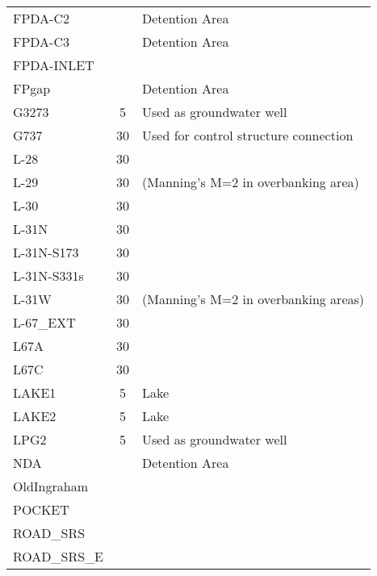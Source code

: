 \begin{table}[!h]
\begin{tabular}{lcl}
FPDA-C2            &              & Detention Area                              \\
FPDA-C3            &              & Detention Area                              \\
FPDA-INLET         &              &                                             \\
FPgap              &              & Detention Area                              \\
G3273              & 5            & Used as groundwater well                    \\
G737               & 30           & Used for control structure connection       \\
L-28               & 30           &                                             \\
L-29               & 30           & (Manning's M=2 in overbanking area)         \\
L-30               & 30           &                                             \\
L-31N              & 30           &                                             \\
L-31N-S173         & 30           &                                             \\
L-31N-S331s        & 30           &                                             \\
L-31W              & 30           & (Manning's M=2 in overbanking areas)        \\
L-67\_EXT          & 30           &                                             \\
L67A               & 30           &                                             \\
L67C               & 30           &                                             \\
LAKE1              & 5            & Lake                                        \\
LAKE2              & 5            & Lake                                        \\
LPG2               & 5            & Used as groundwater well                    \\
NDA                &              & Detention Area                              \\
OldIngraham        &              &                                             \\
POCKET             &              &                                             \\
ROAD\_SRS          &              &                                             \\
ROAD\_SRS\_E       &              &                                             \\
\hline
\end{tabular}
\end{table}

